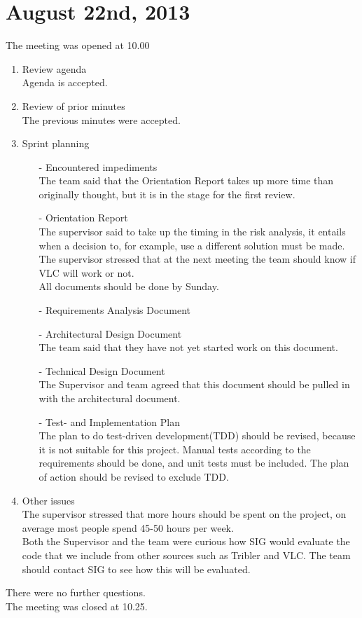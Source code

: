 \section{August 22nd, 2013}

The meeting was opened at 10.00

\begin{enumerate}
\item Review agenda	\\	
Agenda is accepted.
\item Review of prior minutes\\
The previous minutes were accepted.
\item Sprint planning
\begin{enumerate}
\item[-] Encountered impediments\\
The team said that the Orientation Report takes up more time than originally thought, but it is in the stage for the first review.
\item[-] Orientation Report\\
The supervisor said to take up the timing in the risk analysis, it entails when a decision to, for example, use a different solution must be made.\\
The supervisor stressed that at the next meeting the team should know if VLC will work or not.\\

All documents should be done by Sunday.
\item[-] Requirements Analysis Document\\
\item[-] Architectural Design Document\\
The team said that they have not yet started work on this document.
\item[-] Technical Design Document\\
The Supervisor and team agreed that this document should be pulled in with the architectural document.
\item[-] Test- and Implementation Plan\\
The plan to do test-driven development(TDD) should be revised, because it is not suitable for this project. Manual tests according to the requirements should be done, and unit tests must be included.
The plan of action should be revised to exclude TDD.\\
\end{enumerate}
\item Other issues\\
The supervisor stressed that more hours should be spent on the project, on average most people spend 45-50 hours per week.\\
Both the Supervisor and the team were curious how SIG would evaluate the code that we include from other sources such as Tribler and VLC. The team should contact SIG to see how this will be evaluated.

\end{enumerate}
There were no further questions.\\

\noindent The meeting was closed at 10.25.\\


